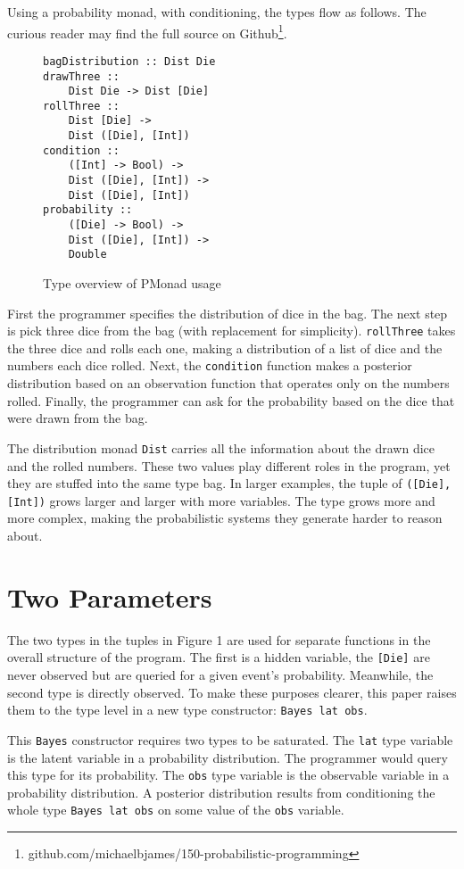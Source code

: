 \documentclass[9pt,twocolumn]{article}
\begin{document}
Using a probability monad, with conditioning, the types flow as follows. The curious reader may find the full source on Github\footnote{github.com/michaelbjames/150-probabilistic-programming}.
\begin{figure}[H]
\begin{verbatim}
bagDistribution :: Dist Die
drawThree ::
    Dist Die -> Dist [Die]
rollThree ::
    Dist [Die] ->
    Dist ([Die], [Int])
condition ::
    ([Int] -> Bool) ->
    Dist ([Die], [Int]) ->
    Dist ([Die], [Int])
probability ::
    ([Die] -> Bool) ->
    Dist ([Die], [Int]) ->
    Double
\end{verbatim}
\caption{Type overview of PMonad usage}
\end{figure}

First the programmer specifies the distribution of dice in the bag. The next step is pick three dice from the bag (with replacement for simplicity). \texttt{rollThree} takes the three dice and rolls each one, making a distribution of a list of dice and the numbers each dice rolled. Next, the \texttt{condition} function makes a posterior distribution based on an observation function that operates only on the numbers rolled. Finally, the programmer can ask for the probability based on the dice that were drawn from the bag.

The distribution monad \texttt{Dist} carries all the information about the drawn dice and the rolled numbers. These two values play different roles in the program, yet they are stuffed into the same type bag. In larger examples, the tuple of \texttt{([Die],[Int])} grows larger and larger with more variables. The type grows more and more complex, making the probabilistic systems they generate harder to reason about.

\section{Two Parameters}
The two types in the tuples in Figure 1 are used for separate functions in the overall structure of the program. The first is a hidden variable, the \texttt{[Die]} are never observed but are queried for a given event's probability. Meanwhile, the second type is directly observed. To make these purposes clearer, this paper raises them to the type level in a new type constructor: \texttt{Bayes lat obs}.

This \texttt{Bayes} constructor requires two types to be saturated. The \texttt{lat} type variable is the latent variable in a probability distribution. The programmer would query this type for its probability. The \texttt{obs} type variable is the observable variable in a probability distribution. A posterior distribution results from conditioning the whole type \texttt{Bayes lat obs} on some value of the \texttt{obs} variable.
\end{document}
